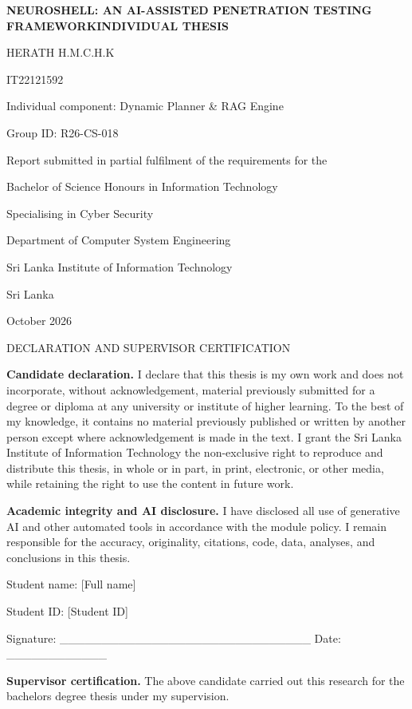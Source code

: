 \documentclass[
]{article}
\author{}
\date{}
\begin{document}
\textbf{NEUROSHELL: AN AI-ASSISTED PENETRATION TESTING
FRAMEWORKINDIVIDUAL THESIS}

HERATH H.M.C.H.K

IT22121592

Individual component: Dynamic Planner \& RAG Engine

Group ID: R26-CS-018

Report submitted in partial fulfilment of the requirements for the

Bachelor of Science Honours in Information Technology

Specialising in Cyber Security

Department of Computer System Engineering

Sri Lanka Institute of Information Technology

Sri Lanka

October 2026

DECLARATION AND SUPERVISOR CERTIFICATION

\textbf{Candidate declaration.} I declare that this thesis is my own
work and does not incorporate, without acknowledgement, material
previously submitted for a degree or diploma at any university or
institute of higher learning. To the best of my knowledge, it contains
no material previously published or written by another person except
where acknowledgement is made in the text. I grant the Sri Lanka
Institute of Information Technology the non-exclusive right to reproduce
and distribute this thesis, in whole or in part, in print, electronic,
or other media, while retaining the right to use the content in future
work.

\textbf{Academic integrity and AI disclosure.} I have disclosed all use
of generative AI and other automated tools in accordance with the module
policy. I remain responsible for the accuracy, originality, citations,
code, data, analyses, and conclusions in this thesis.

Student name: {[}Full name{]}

Student ID: {[}Student ID{]}

Signature: \_\_\_\_\_\_\_\_\_\_\_\_\_\_\_\_\_\_\_\_\_\_\_\_\_\_\_\_\_\_
Date: \_\_\_\_\_\_\_\_\_\_\_\_

\textbf{Supervisor certification.} The above candidate carried out this
research for the bachelor\textquotesingle s degree thesis under my
supervision.
\end{document}
